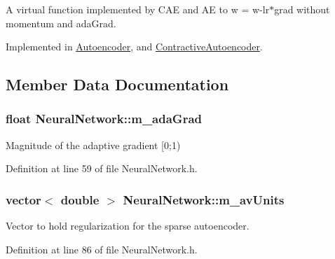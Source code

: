 A virtual function implemented by C\+AE and AE to w = w-\/lr$\ast$grad without momentum and ada\+Grad. 



Implemented in \hyperlink{classAutoencoder_aba5d429d35741aadbaf350364f64af7c}{Autoencoder}, and \hyperlink{classContractiveAutoencoder_a66faa7d13437de0e864a6adec9994cd8}{Contractive\+Autoencoder}.



\subsection{Member Data Documentation}
\subsubsection[{\texorpdfstring{m\+\_\+ada\+Grad}{m_adaGrad}}]{\setlength{\rightskip}{0pt plus 5cm}float Neural\+Network\+::m\+\_\+ada\+Grad\hspace{0.3cm}{\ttfamily [protected]}}\hypertarget{classNeuralNetwork_a30141464584fc2cc51599ffec4ce8dd8}{}\label{classNeuralNetwork_a30141464584fc2cc51599ffec4ce8dd8}


Magnitude of the adaptive gradient \mbox{[}0;1) 



Definition at line 59 of file Neural\+Network.\+h.

\subsubsection[{\texorpdfstring{m\+\_\+av\+Units}{m_avUnits}}]{\setlength{\rightskip}{0pt plus 5cm}vector$<$ double $>$ Neural\+Network\+::m\+\_\+av\+Units\hspace{0.3cm}{\ttfamily [protected]}}\hypertarget{classNeuralNetwork_a257969584b79a83070b07462b1ec7fb2}{}\label{classNeuralNetwork_a257969584b79a83070b07462b1ec7fb2}


Vector to hold regularization for the sparse autoencoder. 



Definition at line 86 of file Neural\+Network.\+h.


